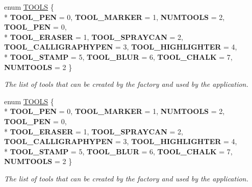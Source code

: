 \begin{DoxyCompactItemize}
\item 
enum \hyperlink{classimage__tools_1_1ToolFactory_a75e9b7d0223f34953e6ea2c45612396f}{T\+O\+O\+LS} \{ \\*
{\bfseries T\+O\+O\+L\+\_\+\+P\+EN} = 0, 
{\bfseries T\+O\+O\+L\+\_\+\+M\+A\+R\+K\+ER} = 1, 
{\bfseries N\+U\+M\+T\+O\+O\+LS} = 2, 
{\bfseries T\+O\+O\+L\+\_\+\+P\+EN} = 0, 
\\*
{\bfseries T\+O\+O\+L\+\_\+\+E\+R\+A\+S\+ER} = 1, 
{\bfseries T\+O\+O\+L\+\_\+\+S\+P\+R\+A\+Y\+C\+AN} = 2, 
{\bfseries T\+O\+O\+L\+\_\+\+C\+A\+L\+L\+I\+G\+R\+A\+P\+H\+Y\+P\+EN} = 3, 
{\bfseries T\+O\+O\+L\+\_\+\+H\+I\+G\+H\+L\+I\+G\+H\+T\+ER} = 4, 
\\*
{\bfseries T\+O\+O\+L\+\_\+\+S\+T\+A\+MP} = 5, 
{\bfseries T\+O\+O\+L\+\_\+\+B\+L\+UR} = 6, 
{\bfseries T\+O\+O\+L\+\_\+\+C\+H\+A\+LK} = 7, 
{\bfseries N\+U\+M\+T\+O\+O\+LS} = 2
 \}\hypertarget{classimage__tools_1_1ToolFactory_a75e9b7d0223f34953e6ea2c45612396f}{}\label{classimage__tools_1_1ToolFactory_a75e9b7d0223f34953e6ea2c45612396f}
\begin{DoxyCompactList}\small\item\em The list of tools that can be created by the factory and used by the application. \end{DoxyCompactList}
\item 
enum \hyperlink{classimage__tools_1_1ToolFactory_a75e9b7d0223f34953e6ea2c45612396f}{T\+O\+O\+LS} \{ \\*
{\bfseries T\+O\+O\+L\+\_\+\+P\+EN} = 0, 
{\bfseries T\+O\+O\+L\+\_\+\+M\+A\+R\+K\+ER} = 1, 
{\bfseries N\+U\+M\+T\+O\+O\+LS} = 2, 
{\bfseries T\+O\+O\+L\+\_\+\+P\+EN} = 0, 
\\*
{\bfseries T\+O\+O\+L\+\_\+\+E\+R\+A\+S\+ER} = 1, 
{\bfseries T\+O\+O\+L\+\_\+\+S\+P\+R\+A\+Y\+C\+AN} = 2, 
{\bfseries T\+O\+O\+L\+\_\+\+C\+A\+L\+L\+I\+G\+R\+A\+P\+H\+Y\+P\+EN} = 3, 
{\bfseries T\+O\+O\+L\+\_\+\+H\+I\+G\+H\+L\+I\+G\+H\+T\+ER} = 4, 
\\*
{\bfseries T\+O\+O\+L\+\_\+\+S\+T\+A\+MP} = 5, 
{\bfseries T\+O\+O\+L\+\_\+\+B\+L\+UR} = 6, 
{\bfseries T\+O\+O\+L\+\_\+\+C\+H\+A\+LK} = 7, 
{\bfseries N\+U\+M\+T\+O\+O\+LS} = 2
 \}\hypertarget{classimage__tools_1_1ToolFactory_a75e9b7d0223f34953e6ea2c45612396f}{}\label{classimage__tools_1_1ToolFactory_a75e9b7d0223f34953e6ea2c45612396f}
\begin{DoxyCompactList}\small\item\em The list of tools that can be created by the factory and used by the application. \end{DoxyCompactList}
\end{DoxyCompactItemize}
